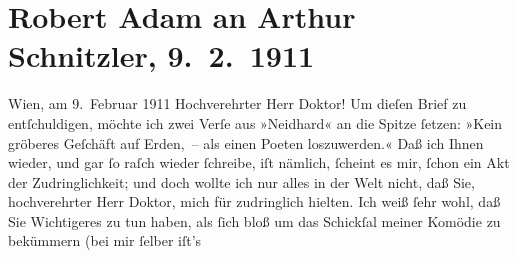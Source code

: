 

         \renewcommand{\erwaehnteInstitutionen}{Institutionen: S. Fischer Verlag}
         \renewcommand{\erwaehnteOrte}{Orte: Wien}
         \renewcommand{\erwaehnteWerke}{Werke: Neidhard}
               \section[Robert Adam an Arthur Schnitzler, 9. 2. 1911]{ Robert Adam an Arthur Schnitzler, 9. 2. 1911}\nopagebreak{}\rehead{ }\begin{ledgroupsized}[t]{13cm}\normalsize\beginnumbering \toendnotes[C]{\smallbreak\pagebreak[2]} 
\toendnotes[C]{\smallbreak}\pstart
           \raggedleft{}{\pb}Wien, am 9. Februar 1911\pend
           \pstart{}Hochverehrter Herr Doktor!\pend\pstart
           Um dieſen Brief zu entſchuldigen, möchte ich zwei Verſe aus »Neidhard« an die Spitze ſetzen: »Kein gröberes Geſchäft auf
               Erden, – als einen Poeten loszuwerden.« Daß ich Ihnen wieder, und gar ſo raſch wieder
               ſchreibe, iſt nämlich, ſcheint es mir, ſchon ein Akt der Zudringlichkeit; und doch
               wollte ich nur alles in der Welt nicht, daß Sie, hochverehrter Herr Doktor, mich für
               zudringlich hielten. Ich weiß ſehr wohl, daß Sie Wichtigeres zu tun haben, als ſich
               bloß um das Schickſal meiner Komödie zu beküm{\pb}mern (bei mir ſelber iſt’s

\end{ledgroupsized}
